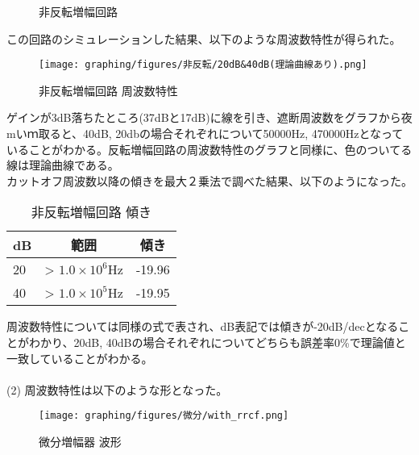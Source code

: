 \documentclass{ltjsarticle}
\begin{document}
\begin{figure}[H]
\begin{center}
\begin{tikzpicture}[circuit ee IEC, scale=0.6666666667,line width=.5pt]
            \end{tikzpicture}

        \caption{非反転増幅回路}
    \end{center}
\end{figure}

この回路のシミュレーションした結果、以下のような周波数特性が得られた。

\begin{figure}[H]
    \begin{center}
        \texttt{[image: graphing/figures/非反転/20dB\&40dB(理論曲線あり).png]}
        \caption{非反転増幅回路 周波数特性}
    \end{center}
\end{figure}

ゲインが3dB落ちたところ(37dBと17dB)に線を引き、遮断周波数をグラフから夜mいｍ取ると、40dB, 20dbの場合それぞれについて50000Hz, 470000Hzとなっていることがわかる。反転増幅回路の周波数特性のグラフと同様に、色のついてる線は理論曲線である。
\\
カットオフ周波数以降の傾きを最大２乗法で調べた結果、以下のようになった。

\begin{table}[H]
    \begin{center}
        \begin{tabular}{|l|c|c|} \hline
            dB & 範囲 & 傾き \\ \hline
            20 & > $1.0\times 10^{6}$Hz & -19.96 \\ \hline
            40 & > $1.0 \times 10^5$Hz & -19.95 \\ \hline
        \end{tabular}
        \caption{非反転増幅回路 傾き}
    \end{center}
\end{table}

周波数特性については同様の式で表され、dB表記では傾きが-20dB/decとなることがわかり、20dB, 40dBの場合それぞれについてどちらも誤差率0\%で理論値と一致していることがわかる。
\\~\\
(2)
周波数特性は以下のような形となった。
\begin{figure}[H]
    \begin{center}
        \texttt{[image: graphing/figures/微分/with\_rrcf.png]}
        \caption{微分増幅器 波形}
    \end{center}
\end{figure}
\end{document}
